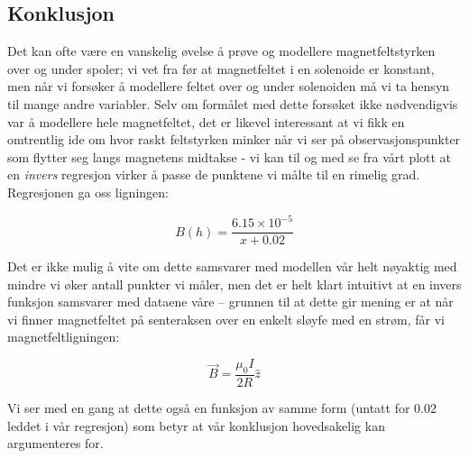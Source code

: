\documentclass{article}
\begin{document}
\subsection{Konklusjon}
Det kan ofte være en vanskelig øvelse å prøve og modellere magnetfeltstyrken over og under spoler; vi vet fra før at magnetfeltet i en solenoide er konstant, men når vi forsøker å modellere feltet over og under solenoiden må vi ta hensyn til mange andre variabler. Selv om formålet med dette forsøket ikke nødvendigvis var å modellere hele magnetfeltet, det er likevel interessant at vi fikk en omtrentlig ide om hvor raskt feltstyrken minker når vi ser på observasjonspunkter som flytter seg langs magnetens midtakse - vi kan til og med se fra vårt plott at en \textit{invers} regresjon virker å passe de punktene vi målte til en rimelig grad. Regresjonen ga oss ligningen:

\begin{equation}
B(h) =  \frac{6.15 \times 10^{-5}}{x + 0.02}
\end{equation}

Det er ikke mulig å vite om dette samsvarer med modellen vår helt nøyaktig med mindre vi øker antall punkter vi måler, men det er helt klart intuitivt at en invers funksjon samsvarer med dataene våre – grunnen til at dette gir mening er at når vi finner magnetfeltet på senteraksen over en enkelt sløyfe med en strøm, får vi magnetfeltligningen:

\begin{equation}
\vec{B} = \frac{\mu_0 I}{2R}\hat{z}
\end{equation}

Vi ser med en gang at dette også en funksjon av samme form (untatt for $0.02$ leddet i vår regresjon) som betyr at vår konklusjon hovedsakelig kan argumenteres for.
\end{document}
